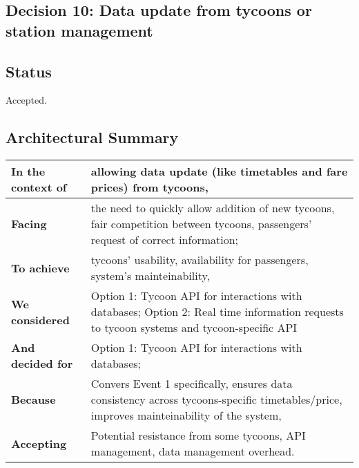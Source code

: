 \subsection{Decision 10: Data update from tycoons or station management}

\subsection*{Status}
Accepted.
\subsection*{Architectural Summary}
\begin{tabular}{|p{3.5cm}|p{10.5cm}|}
    \hline
    \textbf{In the context of} & allowing data update (like timetables and fare prices) from tycoons, \\
    \hline
    \textbf{Facing} & the need to quickly allow addition of new tycoons, fair competition between tycoons, passengers' request of correct information; \\
    \hline
    \textbf{To achieve} & tycoons' usability, availability for passengers, system's mainteinability, \\
    \hline
    \textbf{We considered} & Option 1: Tycoon API for interactions with databases; Option 2: Real time information requests to tycoon systems and tycoon-specific API \\
    \hline
    \textbf{And decided for} & Option 1: Tycoon API for interactions with databases;\\
    \hline
    \textbf{Because} & Convers Event 1 specifically, ensures data consistency across tycoons-specific timetables/price, improves mainteinability of the system, \\
    \hline
    \textbf{Accepting} & Potential resistance from some tycoons, API management, data management overhead. \\
    \hline
\end{tabular}



